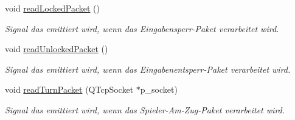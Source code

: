 \begin{DoxyCompactItemize}
void \hyperlink{class_packet_handler_acba72c3a586146653ad0b6c0851dbc0c}{read\+Locked\+Packet} ()
\begin{DoxyCompactList}\small\item\em Signal das emittiert wird, wenn das Eingabensperr-\/\+Paket verarbeitet wird. \end{DoxyCompactList}\item 
void \hyperlink{class_packet_handler_a309f2c1cd016039c1fe8b38d75b3ef7c}{read\+Unlocked\+Packet} ()
\begin{DoxyCompactList}\small\item\em Signal das emittiert wird, wenn das Eingabenentsperr-\/\+Paket verarbeitet wird. \end{DoxyCompactList}\item 
void \hyperlink{class_packet_handler_aceaa87f977376e769e840db3e0756bfe}{read\+Turn\+Packet} (Q\+Tcp\+Socket $\ast$p\+\_\+socket)
\begin{DoxyCompactList}\small\item\em Signal das emittiert wird, wenn das Spieler-\/\+Am-\/\+Zug-\/\+Paket verarbeitet wird. \end{DoxyCompactList}\end{DoxyCompactItemize}

